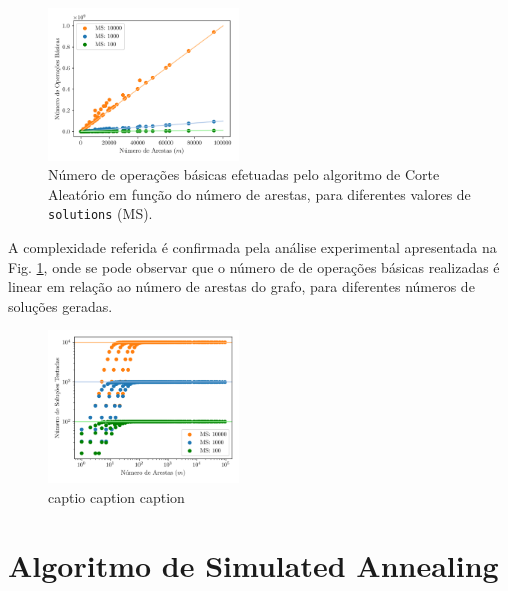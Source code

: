 \documentclass[mirror, portugues]{revdetua}
\begin{document}
\begin{figure}[H]
    \centering
    \includegraphics[width=0.45\textwidth]{../assets/ops_Random Sol.png}
    \caption{Número de operações básicas efetuadas pelo algoritmo de Corte Aleatório em função do número de arestas, para diferentes valores de \texttt{solutions} (MS).}
    \label{fig:random_ops}
\end{figure}

A complexidade referida é confirmada pela análise experimental apresentada na Fig. \ref{fig:random_ops}, onde se pode observar que o número de de operações básicas realizadas é linear em relação ao número de arestas do grafo, para diferentes números de soluções geradas.



\begin{figure}[H]
    \centering
    \includegraphics[width=0.45\textwidth]{../assets/sols_Random Sol.png}
    \caption{captio caption caption}
    \label{fig:sols_randomrandom}
\end{figure}


\section{Algoritmo de Simulated Annealing}
\end{document}
